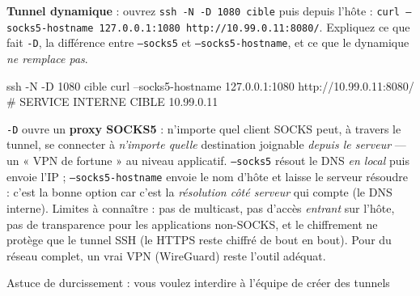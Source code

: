 \documentclass[a4paper,10pt]{exam}
\begin{document}
\begin{questions}
\question \textbf{Tunnel dynamique} : ouvrez \texttt{ssh -N -D 1080 cible} puis depuis
l'hôte : \texttt{curl --socks5-hostname 127.0.0.1:1080
http://10.99.0.11:8080/}. Expliquez ce que fait \texttt{-D}, la différence entre
\texttt{--socks5} et \texttt{--socks5-hostname}, et ce que le dynamique \emph{ne remplace
pas}.
\begin{solution}
\begin{bashcode}
ssh -N -D 1080 cible
curl --socks5-hostname 127.0.0.1:1080 http://10.99.0.11:8080/
# SERVICE INTERNE CIBLE 10.99.0.11
\end{bashcode}
\texttt{-D} ouvre un \textbf{proxy SOCKS5} : n'importe quel client SOCKS peut, à travers
le tunnel, se connecter à \emph{n'importe quelle} destination joignable \emph{depuis le
serveur} — un « VPN de fortune » au niveau applicatif.
\texttt{--socks5} résout le DNS \emph{en local} puis envoie l'IP ;
\texttt{--socks5-hostname} envoie le nom d'hôte et laisse le serveur résoudre : c'est la
bonne option car c'est la \emph{résolution côté serveur} qui compte (le DNS interne).
Limites à connaître : pas de multicast, pas d'accès \emph{entrant} sur l'hôte, pas de
transparence pour les applications non-SOCKS, et le chiffrement ne protège que le tunnel
SSH (le HTTPS reste chiffré de bout en bout). Pour du réseau complet, un vrai VPN
(WireGuard) reste l'outil adéquat.
\end{solution}
\question Astuce de durcissement : vous voulez interdire à l'équipe de créer des tunnels

\end{questions}
\end{document}

